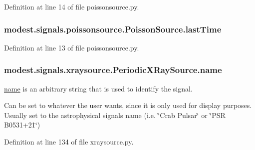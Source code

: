 Definition at line 14 of file poissonsource.\+py.

\subsubsection[{\texorpdfstring{last\+Time}{lastTime}}]{\setlength{\rightskip}{0pt plus 5cm}modest.\+signals.\+poissonsource.\+Poisson\+Source.\+last\+Time\hspace{0.3cm}{\ttfamily [inherited]}}\hypertarget{classmodest_1_1signals_1_1poissonsource_1_1PoissonSource_a34395fc83bd8743a0a5ee69f9392a606}{}\label{classmodest_1_1signals_1_1poissonsource_1_1PoissonSource_a34395fc83bd8743a0a5ee69f9392a606}


Definition at line 13 of file poissonsource.\+py.

\subsubsection[{\texorpdfstring{name}{name}}]{\setlength{\rightskip}{0pt plus 5cm}modest.\+signals.\+xraysource.\+Periodic\+X\+Ray\+Source.\+name}\hypertarget{classmodest_1_1signals_1_1xraysource_1_1PeriodicXRaySource_aac8308319d4f31067e1087660a15db03}{}\label{classmodest_1_1signals_1_1xraysource_1_1PeriodicXRaySource_aac8308319d4f31067e1087660a15db03}


\hyperlink{classmodest_1_1signals_1_1xraysource_1_1PeriodicXRaySource_aac8308319d4f31067e1087660a15db03}{name} is an arbitrary string that is used to identify the signal. 

Can be set to whatever the user wants, since it is only used for display purposes. Usually set to the astrophysical signal\textquotesingle{}s name (i.\+e. \char`\"{}\+Crab Pulsar\char`\"{} or \char`\"{}\+P\+S\+R B0531+21\char`\"{}) 

Definition at line 134 of file xraysource.\+py.

